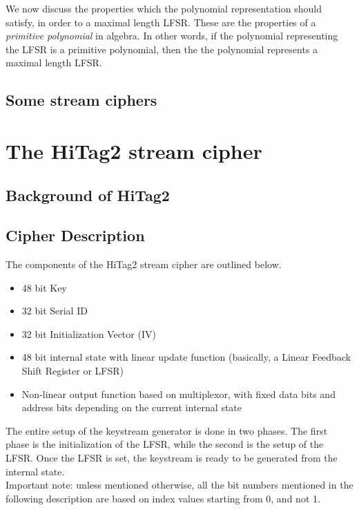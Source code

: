 We now discuss the properties which the polynomial representation should satisfy, in order to  a maximal length LFSR. These are the properties of a \textit{primitive polynomial} in algebra. In other words, if the polynomial representing the LFSR is a primitive polynomial, then the the polynomial represents a maximal length LFSR. 


\subsection{Some stream ciphers}

\section{The HiTag2 stream cipher}
\label{sec:hitag2}

\subsection{Background of HiTag2}

\subsection{Cipher Description}
The components of the HiTag2 stream cipher are outlined below. 
\begin{itemize}
\item 48 bit Key
\item 32 bit Serial ID
\item 32 bit Initialization Vector (IV)
\item 48 bit internal state with linear update function (basically, a Linear Feedback Shift Register or LFSR)
\item Non-linear output function based on multiplexor, with fixed data bits and address bits depending on the current internal state
\end{itemize}

The entire setup of the keystream generator is done in two phases. The first phase is the initialization of the LFSR, while the second is the setup of the LFSR. Once the LFSR is set, the keystream is ready to be generated from the internal state.\\ Important note: unless mentioned otherwise, all the bit numbers mentioned in the following description are based on index values starting from 0, and not 1.\\

